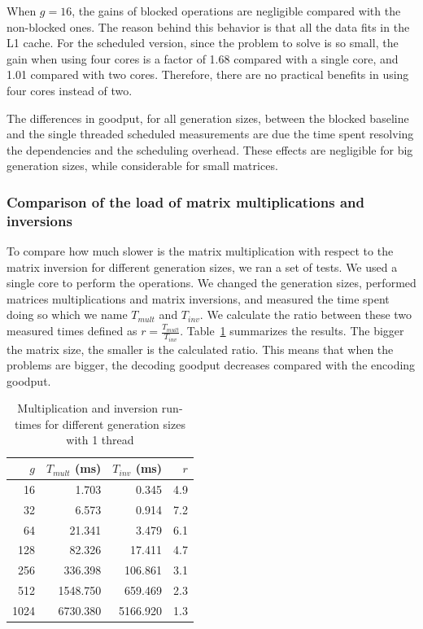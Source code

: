 When $g = 16$, the gains of blocked operations are negligible compared with
the non-blocked ones. The reason behind this behavior is that all the data
fits in the L1 cache. For the scheduled version, since the problem to solve
is so small, the gain when using four cores is a factor of 1.68 compared
with a single core, and 1.01 compared with two cores. Therefore, there
are no practical benefits in using four cores instead of two.

The differences in goodput, for all generation sizes, between the
blocked baseline and the single threaded scheduled measurements are due the
time spent resolving the dependencies and the scheduling overhead. These
effects are negligible for big generation sizes, while considerable for
small matrices.

\subsubsection{Comparison of the load of matrix multiplications and inversions}

To compare how much slower is the matrix multiplication with respect to the
matrix inversion for different generation sizes, we ran a set of tests. We used
a single core to perform the operations. We changed the generation sizes,
performed matrices multiplications and matrix inversions, and measured the time
spent doing so which we name $T_{mult}$ and $T_{inv}$. We calculate the ratio
between these two measured times defined as $r = \frac{T_{mult}}{T_{inv}}$.
Table~\ref{runtimes} summarizes the results. The bigger the matrix size, the
smaller is the calculated ratio. This means that when the problems are bigger,
the decoding goodput decreases compared with the encoding goodput.

\begin{table}[H]
\center
\caption{Multiplication and inversion run-times for different generation sizes with 1 thread}
\begin{tabular}{|r|r|r|r|}

\hline
$g$ & $T_{mult}$ (ms) & $T_{inv}$ (ms) &$r$ \\
\hline
\hline

	16   & 1.703     & 0.345    & 4.9 \\
\hline
	32   & 6.573     & 0.914    & 7.2 \\
\hline
	64   & 21.341    & 3.479    & 6.1 \\
\hline
	128  & 82.326    & 17.411   & 4.7 \\
\hline
	256  & 336.398   & 106.861  & 3.1 \\
\hline
	512  & 1548.750  & 659.469  & 2.3 \\
\hline
	1024 & 6730.380  & 5166.920 & 1.3 \\
\hline
\end{tabular}
\vspace{0.2cm}
\label{runtimes}
\end{table}
